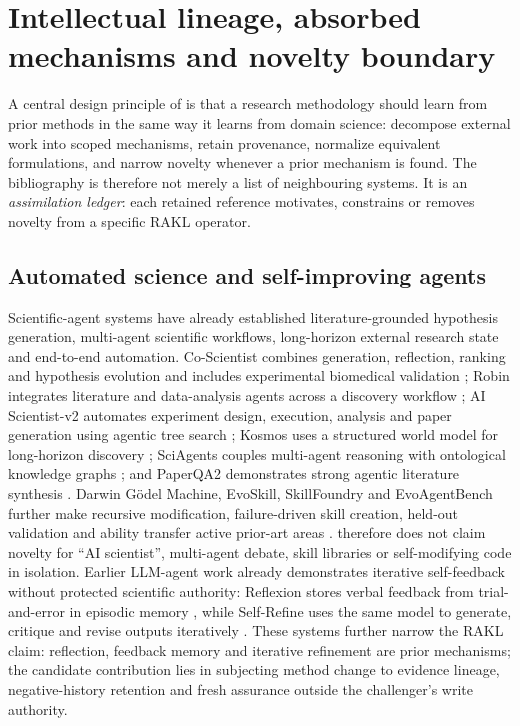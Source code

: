 \section{Intellectual lineage, absorbed mechanisms and novelty boundary}
A central design principle of \RAKL{} is that a research methodology should learn from prior methods in the same way it learns from domain science: decompose external work into scoped mechanisms, retain provenance, normalize equivalent formulations, and narrow novelty whenever a prior mechanism is found. The bibliography is therefore not merely a list of neighbouring systems. It is an \emph{assimilation ledger}: each retained reference motivates, constrains or removes novelty from a specific RAKL operator.

\subsection{Automated science and self-improving agents}
Scientific-agent systems have already established literature-grounded hypothesis generation, multi-agent scientific workflows, long-horizon external research state and end-to-end automation. Co-Scientist combines generation, reflection, ranking and hypothesis evolution and includes experimental biomedical validation \cite{gottweis2026}; Robin integrates literature and data-analysis agents across a discovery workflow \cite{ghareeb2026}; AI Scientist-v2 automates experiment design, execution, analysis and paper generation using agentic tree search \cite{yamada2025}; Kosmos uses a structured world model for long-horizon discovery \cite{mitchener2025}; SciAgents couples multi-agent reasoning with ontological knowledge graphs \cite{ghafarollahi2024}; and PaperQA2 demonstrates strong agentic literature synthesis \cite{skarlinski2024}. Darwin G\"odel Machine, EvoSkill, SkillFoundry and EvoAgentBench further make recursive modification, failure-driven skill creation, held-out validation and ability transfer active prior-art areas \cite{zhang2025,alzubi2026,shen2026,gao2026}. \RAKL{} therefore does not claim novelty for ``AI scientist'', multi-agent debate, skill libraries or self-modifying code in isolation. Earlier LLM-agent work already demonstrates iterative self-feedback without protected scientific authority: Reflexion stores verbal feedback from trial-and-error in episodic memory \cite{shinn2023}, while Self-Refine uses the same model to generate, critique and revise outputs iteratively \cite{madaan2023}. These systems further narrow the RAKL claim: reflection, feedback memory and iterative refinement are prior mechanisms; the candidate contribution lies in subjecting method change to evidence lineage, negative-history retention and fresh assurance outside the challenger's write authority.

